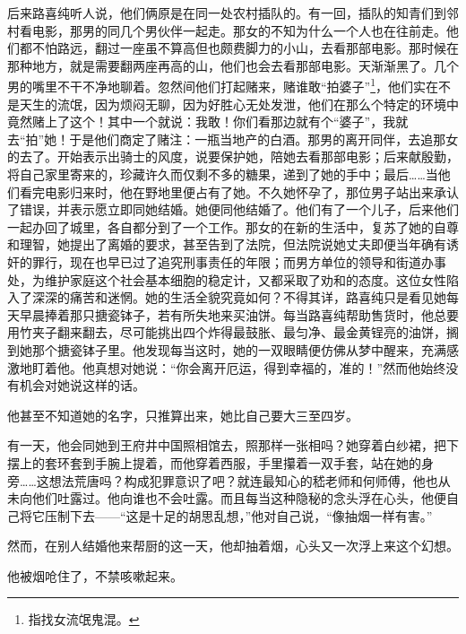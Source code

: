 \par 后来路喜纯听人说，他们俩原是在同一处农村插队的。有一回，插队的知青们到邻村看电影，那男的同几个男伙伴一起走。那女的不知为什么一个人也在往前走。他们都不怕路远，翻过一座虽不算高但也颇费脚力的小山，去看那部电影。那时候在那种地方，就是需要翻两座再高的山，他们也会去看那部电影。天渐渐黑了。几个男的嘴里不干不净地聊着。忽然间他们打起赌来，赌谁敢“拍婆子”\footnote{指找女流氓鬼混。}，他们实在不是天生的流氓，因为烦闷无聊，因为好胜心无处发泄，他们在那么个特定的环境中竟然赌上了这个！其中一个就说：我敢！你们看那边就有个“婆子”，我就去“拍”她！于是他们商定了赌注：一瓶当地产的白酒。那男的离开同伴，去追那女的去了。开始表示出骑士的风度，说要保护她，陪她去看那部电影；后来献殷勤，将自己家里寄来的，珍藏许久而仅剩不多的糖果，递到了她的手中；最后……当他们看完电影归来时，他在野地里便占有了她。不久她怀孕了，那位男子站出来承认了错误，并表示愿立即同她结婚。她便同他结婚了。他们有了一个儿子，后来他们一起办回了城里，各自都分到了一个工作。那女的在新的生活中，复苏了她的自尊和理智，她提出了离婚的要求，甚至告到了法院，但法院说她丈夫即便当年确有诱奸的罪行，现在也早已过了追究刑事责任的年限；而男方单位的领导和街道办事处，为维护家庭这个社会基本细胞的稳定计，又都采取了劝和的态度。这位女性陷入了深深的痛苦和迷惘。她的生活全貌究竟如何？不得其详，路喜纯只是看见她每天早晨捧着那只搪瓷钵子，若有所失地来买油饼。每当路喜纯帮助售货时，他总要用竹夹子翻来翻去，尽可能挑出四个炸得最鼓胀、最匀净、最金黄锃亮的油饼，搁到她那个搪瓷钵子里。他发现每当这时，她的一双眼睛便仿佛从梦中醒来，充满感激地盯着他。他真想对她说：“你会离开厄运，得到幸福的，准的！”然而他始终没有机会对她说这样的话。
\par 他甚至不知道她的名字，只推算出来，她比自己要大三至四岁。
\par 有一天，他会同她到王府井中国照相馆去，照那样一张相吗？她穿着白纱裙，把下摆上的套环套到手腕上提着，而他穿着西服，手里攥着一双手套，站在她的身旁……这想法荒唐吗？构成犯罪意识了吧？就连最知心的嵇老师和何师傅，他也从未向他们吐露过。他向谁也不会吐露。而且每当这种隐秘的念头浮在心头，他便自己将它压制下去——“这是十足的胡思乱想，”他对自己说，“像抽烟一样有害。”
\par 然而，在别人结婚他来帮厨的这一天，他却抽着烟，心头又一次浮上来这个幻想。
\par 他被烟呛住了，不禁咳嗽起来。


